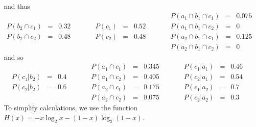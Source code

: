\documentclass[11pt]{article}
\begin{document}
and thus
  \[
    \begin{array}{lllclllclll}
                     & &      & \qquad&        & &      & \qquad & P(a_1\cap b_1\cap c_1) &=& 0.075\\
      P(b_2\cap c_1) &=& 0.32 & \qquad& P(c_1) &=& 0.52 & \qquad & P(a_1\cap b_1\cap c_2) &=& 0\\
      P(b_2\cap c_2) &=& 0.48 &       & P(c_2) &=& 0.48 & \qquad & P(a_2\cap b_1\cap c_1) &=& 0.125\\
                     & &      & \qquad&        & &      & \qquad & P(a_2\cap b_1\cap c_2) &=& 0
    \end{array}
  \]
and so
  \[
    \begin{array}{lllclllclll}
                 & &     & \qquad& P(a_1\cap c_1) &=& 0.345& \qquad& P(c_1|a_1) &=& 0.46\\
      P(c_1|b_2) &=& 0.4 &       & P(a_1\cap c_2) &=& 0.405& \qquad& P(c_2|a_1) &=& 0.54\\
      P(c_2|b_2) &=& 0.6 &       & P(a_2\cap c_1) &=& 0.175&       & P(c_1|a_2) &=& 0.7 \\
                 & &     &       & P(a_2\cap c_2) &=& 0.075& \qquad& P(c_2|a_2) &=& 0.3
    \end{array}
  \]
  To simplify calculations, we use the function $H(x) = -x\log_2 x - (1-x)\log_2(1-x)$.
\end{document}
